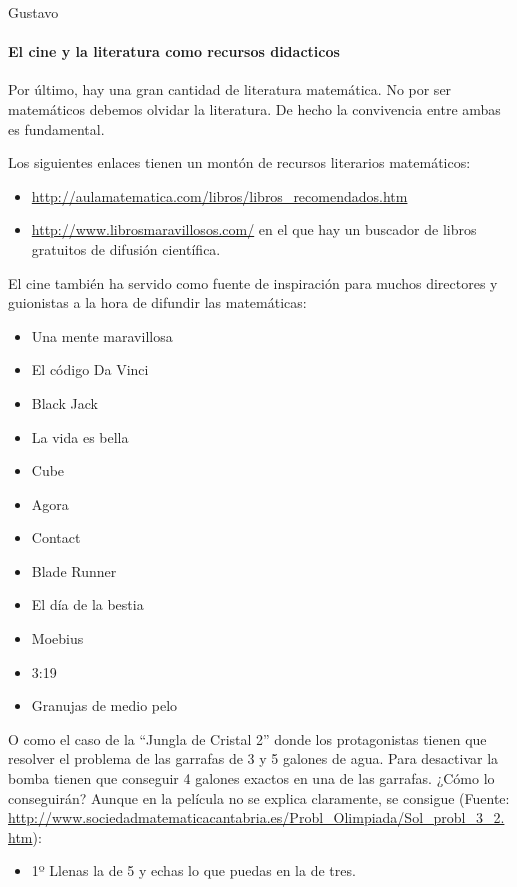 \begin{opin}{\guscolor}{Gustavo}
\begin{leftbar}{\guscolor}
\paragraph{El cine y la literatura como recursos didacticos}
Por último, hay una gran cantidad de literatura matemática. No por ser matemáticos debemos olvidar la literatura. De hecho la convivencia entre ambas es fundamental.

Los siguientes enlaces tienen un montón de recursos literarios matemáticos:
\begin{itemize}
\item \url{http://aulamatematica.com/libros/libros_recomendados.htm}  

\item \url{http://www.librosmaravillosos.com/} en el que hay un buscador de libros gratuitos de difusión científica. 
\end{itemize}
El cine también ha servido como fuente de inspiración para muchos directores y guionistas a la hora de difundir las matemáticas:
\begin{itemize}
\item Una mente maravillosa 

\item El código Da Vinci 

\item Black Jack 

\item La vida es bella 

\item Cube 

\item Agora 

\item Contact 

\item Blade Runner 

\item El día de la bestia 

\item Moebius 

\item 3:19 

\item Granujas de medio pelo 
\end{itemize}
O como el caso de la “Jungla de Cristal 2” donde los protagonistas tienen que resolver el problema de las garrafas de 3 y 5 galones de agua. Para desactivar la bomba tienen que conseguir 4 galones exactos en una de las garrafas. ¿Cómo lo conseguirán? Aunque en la película no se explica claramente, se consigue (Fuente: \url{http://www.sociedadmatematicacantabria.es/Probl_Olimpiada/Sol_probl_3_2.htm}):
\begin{itemize}
\item 1º Llenas la de 5 y echas lo que puedas en la de tres.  


\end{itemize}
\end{leftbar}
\end{opin}
